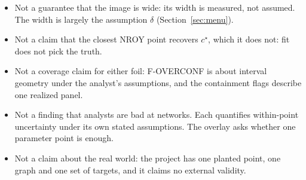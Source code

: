 \documentclass[11pt]{article}
\begin{document}
\begin{itemize}
  \item Not a guarantee that the image is wide: its width is measured,
        not assumed. The width is largely the assumption $\delta$
        (Section~\ref{sec:menu}).
  \item Not a claim that the closest NROY point recovers $c^\star$, which it
        does not: fit does not pick the truth.
  \item Not a coverage claim for either foil: F-OVERCONF is about interval
        geometry under the analyst's assumptions, and the containment flags
        describe one realized panel.
  \item Not a finding that analysts are bad at networks. Each
        quantifies within-point uncertainty under its own stated
        assumptions. The overlay asks whether
        one parameter point is enough.
  \item Not a claim about the real world: the project has one planted
        point, one graph and one set of targets, and it claims no
        external validity.
\end{itemize}

\end{document}
